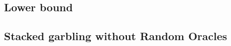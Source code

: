	
	







\subsection{Lower bound}
\label{sec:techOverviewLB}






\subsection{Stacked garbling without Random Oracles}
\label{sec:techOverviewRO}




